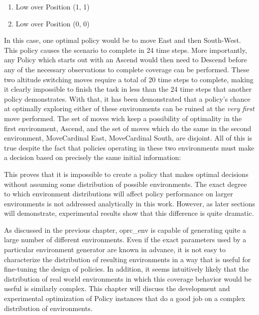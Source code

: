 \begin{enumerate}
	\item Low over Position (1, 1)
	\item Low over Position (0, 0)
\end{enumerate}

In this case, one optimal policy would be to move East and then South-West. This policy causes the scenario to complete in 24 time steps. More importantly, any Policy which starts out with an Ascend would then need to Descend before any of the necessary observations to complete coverage can be performed. These two altitude switching moves require a total of 20 time steps to complete, making it clearly impossible to finish the task in less than the 24 time steps that another policy demonstrates. With that, it has been demonstrated that a policy's chance at optimally exploring either of these environments can be ruined at the \textit{very first} move performed. The set of moves wich keep a possibility of optimality in the first environment, {Ascend}, and the set of moves which do the same in the second environment, {MoveCardinal East, MoveCardinal South}, are disjoint. All of this is true despite the fact that policies operating in these two environments must make a decision based on precisely the same initial information:


This proves that it is impossible to create a policy that makes optimal decisions without assuming some distribution of possible environments. The exact degree to which environment distributions will affect policy performance on larger environments is not addressed analytically in this work. However, as later sections will demonstrate, experimental results show that this difference is quite dramatic.

As discussed in the previous chapter, oprc\_env is capable of generating quite a large number of different environments. Even if the exact parameters used by a particular environment generator are known in advance, it is not easy to characterize the distribution of resulting environments in a way that is useful for fine-tuning the design of policies. In addition, it seems intuitively likely that the distribution of real world environments in which this coverage behavior would be useful is similarly complex. This chapter will discuss the development and experimental optimization of Policy instances that do a good job on a complex distribution of environments.